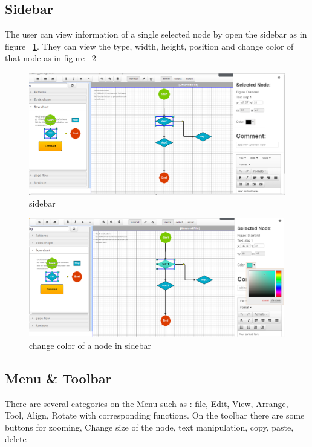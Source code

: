 \documentclass[14pt,a4paper]{extreport}
\begin{document}
		\subsection{Sidebar}
			The user can view information of a single selected node by open the sidebar as in figure ~\ref{sidebar}. They can view the type, width, height, position and change color of that node as in figure ~\ref{sidebarcolor}
			\begin{figure}[ht]
				\begin{center}
					\includegraphics[scale=0.5]{sidebar.png}
					\caption{sidebar}
					\label{sidebar}
				\end{center}
			\end{figure}
			
			\begin{figure}[ht]
				\begin{center}
					\includegraphics[scale=0.5]{sidebarcolor.png}
					\caption{change color of a node in sidebar}
					\label{sidebarcolor}
				\end{center}
			\end{figure}
		\subsection{Menu \& Toolbar}
			There are several categories on the Menu such as : file, Edit, View, Arrange, Tool, Align, Rotate with corresponding functions. On the toolbar there are some buttons for zooming, Change size of the node, text manipulation, copy, paste, delete
\end{document}
